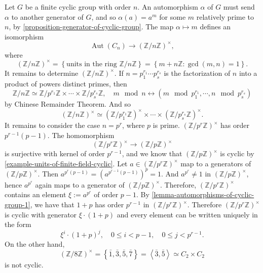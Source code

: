 Let \( G \) be a finite cyclic group with order \( n \).
An automorphism \( \alpha \) of \( G \) must send \( \alpha \) to another generator of \( G \), and so \( \alpha(a) = a^m \) for some \( m \) relatively prime to \( n \), by \ref{proposition-generator-of-cyclic-group}.
The map \( \alpha \mapsto m \) defines an isomorphism
\[
  \operatorname{Aut}(C_n) \to (\mathbb{Z} / n \mathbb{Z})^\times,
\]
where
\[
  (\mathbb{Z} / n \mathbb{Z})^\times = \left\lbrace \text{units in the ring } \mathbb{Z} / n \mathbb{Z} \right\rbrace = \left\lbrace m + n \mathbb{Z}: \gcd(m, n) = 1 \right\rbrace.
\]
It remains to determine \( (\mathbb{Z} / n \mathbb{Z})^\times \).
If \( n = p^{r_1}_1 \cdots p^{r_s}_s \) is the factorization of \( n \) into a product of powers distinct primes, then
\[
  \mathbb{Z} / n \mathbb{Z} \simeq \mathbb{Z} / p^{r_1}\mathbb{Z} \times \cdots \times \mathbb{Z} / p^{r_s}_s \mathbb{Z},\quad m \mod n \leftrightarrow (m \mod p_1^{r_1}, \cdots, n \mod p_s^{r_s})
\]
by Chinese Remainder Theorem.
And so
\[
  (\mathbb{Z} / n \mathbb{Z})^\times \simeq (\mathbb{Z} / p^{r_1}_1 \mathbb{Z})^\times \times \cdots \times (\mathbb{Z} / p^{r_s}_s \mathbb{Z})^\times.
\]
It remains to consider the case \( n = p^r \), where \( p \) is prime.
\( (\mathbb{Z} / p^r \mathbb{Z})^\times \) has order \( p^{r - 1}(p - 1) \).
The homomorphism
\[
  (\mathbb{Z} / p^r \mathbb{Z})^\times \to (\mathbb{Z} / p \mathbb{Z})^\times
\]
is surjective with kernel of order \( p^{r - 1} \), and we know that \( (\mathbb{Z} / p \mathbb{Z})^\times \) is cyclic by \ref{example-units-of-finite-field-cyclic}.
Let \( a \in (\mathbb{Z} / p^r \mathbb{Z})^\times \) map to a generators of \( (\mathbb{Z} / p \mathbb{Z})^\times \).
Then \( a^{p^r(p - 1)} = \left(a^{p^{r - 1}(p - 1)}\right)^{p} = 1 \).
And \( a^{p^r} \neq 1 \) in \( (\mathbb{Z} / p \mathbb{Z})^\times \), hence \( a^{p^r} \) again maps to a generator of \( (\mathbb{Z} / p \mathbb{Z})^\times \).
Therefore, \( (\mathbb{Z} / p^r \mathbb{Z})^\times \) contains an element \( \xi := a^{p^r} \) of order \( p - 1 \).
By \ref{lemma-automorphisms-of-cyclic-group-1}, we have  that \( 1 + p \) has order \( p^{r - 1} \) in \( (\mathbb{Z} / p^r \mathbb{Z})^\times \).
Therefore \( (\mathbb{Z} / p^r \mathbb{Z})^\times \) is cyclic with generator \( \xi \cdot (1 + p) \) and every element can be written uniquely in the form
\[
  \xi^i \cdot (1 + p)^j,\quad 0 \leq i < p - 1,\quad 0 \leq j < p^{r - 1}.
\]
On the other hand,
\[
  (\mathbb{Z} / 8\mathbb{Z})^{\times} = \left\lbrace \bar{1}, \bar{3}, \bar{5}, \bar{7} \right\rbrace = \left\langle \bar{3}, \bar{5} \right\rangle \simeq C_2 \times C_2
\]
is not cyclic.

